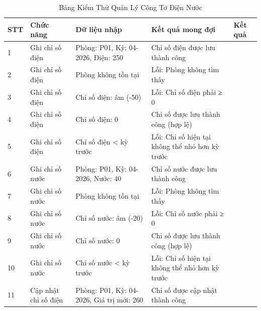 \documentclass[12pt,a4paper]{article}
\begin{document}
\begin{table}[h!]
    \centering
    \caption{Bảng Kiểm Thử Quản Lý Công Tơ Điện Nước}
    \label{tab:meter_management}
    \vspace{2mm}

    \begin{small}
    \begin{tabularx}{\textwidth}{|p{0.8cm}|p{2.5cm}|p{3cm}|p{3cm}|p{2.5cm}|}
    \hline
    \textbf{STT} & \textbf{Chức năng} & \textbf{Dữ liệu nhập} & \textbf{Kết quả mong đợi} & \textbf{Kết quả} \\ \hline

    1 & Ghi chỉ số điện & Phòng: P01, Kỳ: 04-2026, Điện: 250 & Chỉ số điện được lưu thành công & \\ \hline

    2 & Ghi chỉ số điện & Phòng không tồn tại & Lỗi: Phòng không tìm thấy & \\ \hline

    3 & Ghi chỉ số điện & Chỉ số điện: âm (-50) & Lỗi: Chỉ số điện phải ≥ 0 & \\ \hline

    4 & Ghi chỉ số điện & Chỉ số điện: 0 & Chỉ số được lưu thành công (hợp lệ) & \\ \hline

    5 & Ghi chỉ số điện & Chỉ số điện < kỳ trước & Lỗi: Chỉ số hiện tại không thể nhỏ hơn kỳ trước & \\ \hline

    6 & Ghi chỉ số nước & Phòng: P01, Kỳ: 04-2026, Nước: 40 & Chỉ số nước được lưu thành công & \\ \hline

    7 & Ghi chỉ số nước & Phòng không tồn tại & Lỗi: Phòng không tìm thấy & \\ \hline

    8 & Ghi chỉ số nước & Chỉ số nước: âm (-20) & Lỗi: Chỉ số nước phải ≥ 0 & \\ \hline

    9 & Ghi chỉ số nước & Chỉ số nước: 0 & Chỉ số được lưu thành công (hợp lệ) & \\ \hline

    10 & Ghi chỉ số nước & Chỉ số nước < kỳ trước & Lỗi: Chỉ số hiện tại không thể nhỏ hơn kỳ trước & \\ \hline

    11 & Cập nhật chỉ số điện & Phòng: P01, Kỳ: 04-2026, Giá trị mới: 260 & Chỉ số được cập nhật thành công & \\ \hline


\end{tabularx}
\end{small}
\end{table}
\end{document}
